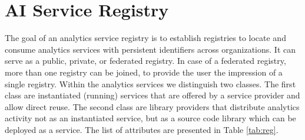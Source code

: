 \documentclass[fullpage,12pt]{article}
\begin{document}
\section{AI Service Registry} 

The goal of an analytics service registry is to establish registries to locate and consume analytics services 
with persistent identifiers across organizations.  It can serve as a public, private, or federated registry. In case of a federated registry, more than one registry can be joined, to provide the user the impression of a single registry.
Within the analytics services we distinguish two classes. The first class are instantiated (running) services that are offered by a service provider and allow direct reuse. The second class are library providers that distribute analytics activity not as an instantiated service, but as a source code library which can be deployed as a service. The list of attributes are presented in Table \ref{tab:reg}.
\end{document}

